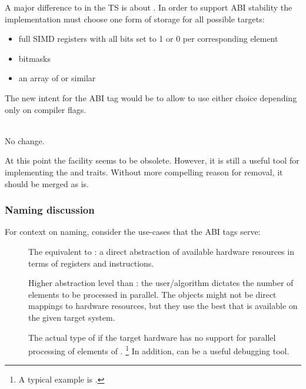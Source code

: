 \begin{description}
    A major difference to \stdx\simdabi{} in the TS is about .
    In order to support ABI stability the  implementation must choose one form of storage for all possible targets:
    \begin{itemize}
      \item full SIMD registers with all bits set to 1 or 0 per corresponding element
      \item bitmasks
      \item an array of  or similar
    \end{itemize}
    The new intent for the  ABI tag would be to allow  to use either choice depending only on compiler flags.

  \item[\code{A2 = \simdabi scalar}]\ \\
    No change.
\end{description}

At this point the \simdabi{} facility seems to be obsolete.
However, it is still a useful tool for implementing the  and  traits.
Without more compelling reason for removal, it should be merged as is.

\subsubsection{Naming discussion}

For context on naming, consider the use-cases that the ABI tags serve:

\begin{description}
  \item[\simdabi{}] The equivalent to : a direct abstraction of available hardware resources in terms of registers and instructions.

  \item[\simdabi{}] Higher abstraction level than : the user/algorithm dictates the number of elements to be processed in parallel.
    The objects might not be direct mappings to hardware resources, but they use the best that is available on the given target system.

  \item[\simdabi{}] The actual type of  if the target hardware has no support for parallel processing of elements of .%
    \footnote{A typical example is \simdabi{}.}
    In addition,  can be a useful debugging tool.
\end{description}

